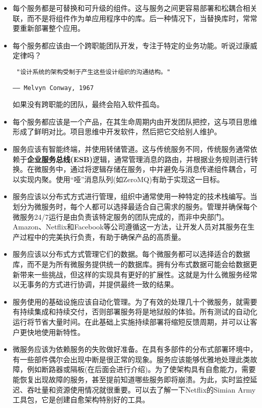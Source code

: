 \begin{itemize}
\item	
每个服务都是可替换和可升级的组件。这与服务之间更容易部署和松耦合相关联，而不是将组件作为单应用程序中的库。后一种情况下，当替换库时，常常要重新部署整个应用。

\item
每个服务都应该由一个跨职能团队开发，专注于特定的业务功能。听说过康威定律吗？

\begin{flushleft}
\tt
"设计系统的架构受制于产生这些设计组织的沟通结构。"
\end{flushleft}
\begin{flushright}
\texttt{—— Melvyn Conway, 1967}
\end{flushright}

如果没有跨职能的团队，最终会陷入软件孤岛。

\item
每个服务都应该是一个产品，在其生命周期内由开发团队把控，这与项目思维形成了鲜明对比。项目思维中开发软件，然后把它交给别人维护。

\item
服务应该有智能终端，并使用转储管道。这与传统服务不同，传统服务通常依赖于\textbf{企业服务总线(ESB)}逻辑，通常管理消息的路由，并根据业务规则进行转换。在微服务中，通过将逻辑存储在服务，中并避免与消息传递组件耦合，可以实现内聚。使用“哑”消息队列(如ZeroMQ)有助于实现这一目标。

\item
服务应该以分布式方式进行管理，组织中通常使用一种特定的技术栈编写。当划分为微服务时，每个人都可以选择最适合自己需求的服务。管理并确保每个微服务24/7运行是由负责该特定服务的团队完成的，而非中央部门。Amazon、Netflix和Facebook等公司遵循这一方法，让开发人员对其服务在生产过程中的完美执行负责，有助于确保产品的高质量。

\item
服务应该以分布式方式管理它们的数据。每个微服务都可以选择适合的数据库，而不是为所有微服务提供统一的数据库。拥有分布式数据可能会给数据更新带来一些挑战，但这样的实现具有更好的扩展性。这就是为什么微服务经常以无事务的方式进行协调，并提供最终一致的结果。

\item
服务使用的基础设施应该自动化管理。为了有效的处理几十个微服务，就需要有持续集成和持续交付，否则部署服务将是地狱般的体验。所有测试的自动化运行将节省大量时间。在此基础上实施持续部署将缩短反馈周期，并可以让客户更快地使用新特性。

\item
微服务应该为依赖服务的失败做好准备。在具有多部件的分布式部署环境中，有一些部件偶尔会出现中断是很正常的现象。服务应该能够优雅地处理此类故障，例如断路器或隔板(在后面会进行介绍)。为了使架构具有自愈能力，需要能恢复出现故障的服务，甚至提前知道哪些服务即将崩溃。为此，实时监控延迟、吞吐量和资源使用情况就很重要。可以去了解一下Netflix的Simian Army工具包，它是创建自愈架构特别好的工具。


\end{itemize}
